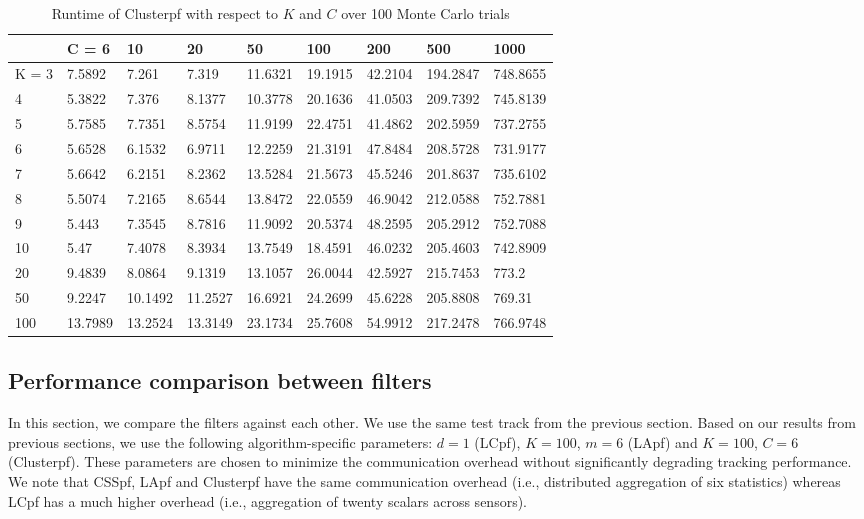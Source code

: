 \documentclass[10pt,letterpaper,final]{article}
\begin{document}
\begin{table}[h!]
\centering
\begin{tabular}{|l|l|l|l|l|l|l|l|l|}
\hline
      & C = 6   & 10      & 20      & 50      & 100     & 200     & 500      & 1000     \\ \hline
K = 3 & 7.5892  & 7.261   & 7.319   & 11.6321 & 19.1915 & 42.2104 & 194.2847 & 748.8655 \\ \hline
4     & 5.3822  & 7.376   & 8.1377  & 10.3778 & 20.1636 & 41.0503 & 209.7392 & 745.8139 \\ \hline
5     & 5.7585  & 7.7351  & 8.5754  & 11.9199 & 22.4751 & 41.4862 & 202.5959 & 737.2755 \\ \hline
6     & 5.6528  & 6.1532  & 6.9711  & 12.2259 & 21.3191 & 47.8484 & 208.5728 & 731.9177 \\ \hline
7     & 5.6642  & 6.2151  & 8.2362  & 13.5284 & 21.5673 & 45.5246 & 201.8637 & 735.6102 \\ \hline
8     & 5.5074  & 7.2165  & 8.6544  & 13.8472 & 22.0559 & 46.9042 & 212.0588 & 752.7881 \\ \hline
9     & 5.443   & 7.3545  & 8.7816  & 11.9092 & 20.5374 & 48.2595 & 205.2912 & 752.7088 \\ \hline
10    & 5.47    & 7.4078  & 8.3934  & 13.7549 & 18.4591 & 46.0232 & 205.4603 & 742.8909 \\ \hline
20    & 9.4839  & 8.0864  & 9.1319  & 13.1057 & 26.0044 & 42.5927 & 215.7453 & 773.2    \\ \hline
50    & 9.2247  & 10.1492 & 11.2527 & 16.6921 & 24.2699 & 45.6228 & 205.8808 & 769.31   \\ \hline
100   & 13.7989 & 13.2524 & 13.3149 & 23.1734 & 25.7608 & 54.9912 & 217.2478 & 766.9748 \\ \hline
\end{tabular}
\caption{Runtime of Clusterpf with respect to $K$ and $C$ over 100 Monte Carlo trials}
\label{tab:runtime_Clusterpf}
\end{table}


\subsection{Performance comparison between filters}
In this section, we compare the filters against each other. We use the same test track from the previous section. Based on our results from previous sections, we use the following algorithm-specific parameters: $d=1$ (LCpf), $K=100$, $m=6$ (LApf) and $K=100$, $C=6$ (Clusterpf). These parameters are chosen to minimize the communication overhead without significantly degrading tracking performance. We note that CSSpf, LApf and Clusterpf have the same communication overhead (i.e., distributed aggregation of six statistics) whereas LCpf has a much higher overhead (i.e., aggregation of twenty scalars across sensors). 
\end{document}
